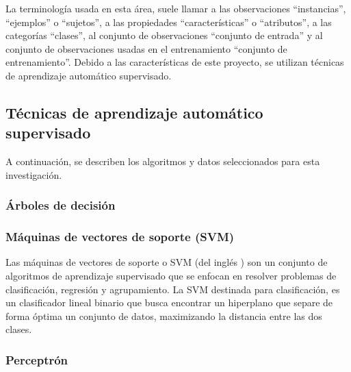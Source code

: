 La terminología usada en esta área, suele llamar a las observaciones “instancias”, “ejemplos” o “sujetos”, a las propiedades “características” o “atributos”, a las categorías “clases”, al conjunto de observaciones “conjunto de entrada” y al conjunto de observaciones usadas en el entrenamiento “conjunto de entrenamiento”. Debido a las características de este proyecto, se utilizan técnicas de aprendizaje automático supervisado.

\subsection{Técnicas de aprendizaje automático supervisado}
\label{subsec:tecnicas-mineria}
A continuación, se describen los algoritmos y datos seleccionados para esta investigación.

\subsubsection*{Árboles de decisión}

\begin{figure}[H]
	\centering
	
	\label{fig:decision-tree}
\end{figure}


\subsubsection*{Máquinas de vectores de soporte (SVM)}
Las máquinas de vectores de soporte o SVM (del inglés ) son un conjunto de algoritmos de aprendizaje supervisado que se enfocan en resolver problemas de clasificación, regresión y agrupamiento. La SVM destinada para clasificación, es un clasificador lineal binario que busca encontrar un hiperplano que separe de forma óptima un conjunto de datos, maximizando la distancia entre las dos clases.


\begin{figure}[H]
	\centering
	
	\label{fig:svm}
\end{figure}

\subsubsection*{Perceptrón}

\begin{figure}[H]
	\centering
	
	\label{fig:perceptron}
\end{figure}

